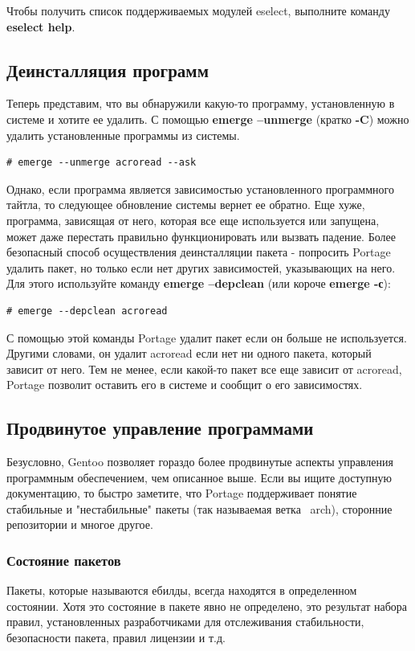 \documentclass[10pt]{book}
\begin{document}
Чтобы получить список поддерживаемых модулей eselect, выполните команду \textbf{eselect help}.
\subsection{Деинсталляция программ}
Теперь представим, что вы обнаружили какую-то программу, установленную в системе и хотите ее удалить. С помощью \textbf{emerge --unmerge} (кратко \textbf{-C}) можно удалить установленные программы из системы.
\begin{tcolorbox}
\begin{lstlisting}
# emerge --unmerge acroread --ask
\end{lstlisting}
\end{tcolorbox}

Однако, если программа является зависимостью установленного программного тайтла, то следующее обновление системы вернет ее обратно. Еще хуже, программа, зависящая от него, которая все еще используется или запущена, может даже перестать правильно функционировать или вызвать падение. Более безопасный способ осуществления деинсталляции пакета - попросить Portage удалить пакет, но только если нет других зависимостей, указывающих на него. Для этого используйте команду \textbf{emerge --depclean} (или короче\textbf{ emerge -с}):
\begin{tcolorbox}
\begin{lstlisting}
# emerge --depclean acroread
\end{lstlisting}
\end{tcolorbox}
С помощью этой команды Portage удалит пакет если он больше не используется. Другими словами, он удалит acroread если нет ни одного пакета, который зависит от него. Тем не менее, если какой-то пакет все еще зависит от acroread, Portage позволит оставить его в системе и сообщит о его зависимостях.

\subsection{Продвинутое управление программами}
Безусловно, Gentoo позволяет гораздо более продвинутые аспекты управления программным обеспечением, чем описанное выше. Если вы ищите доступную документацию, то быстро заметите, что Portage поддерживает понятие стабильные и "нестабильные" пакеты (так называемая ветка  ~arch), сторонние репозитории и многое другое.

\subsubsection{Состояние пакетов}
Пакеты, которые называются ебилды, всегда находятся в определенном состоянии. Хотя это состояние в пакете явно не определено, это результат набора правил, установленных разработчиками для отслеживания стабильности, безопасности пакета, правил лицензии и т.д.
\end{document}
